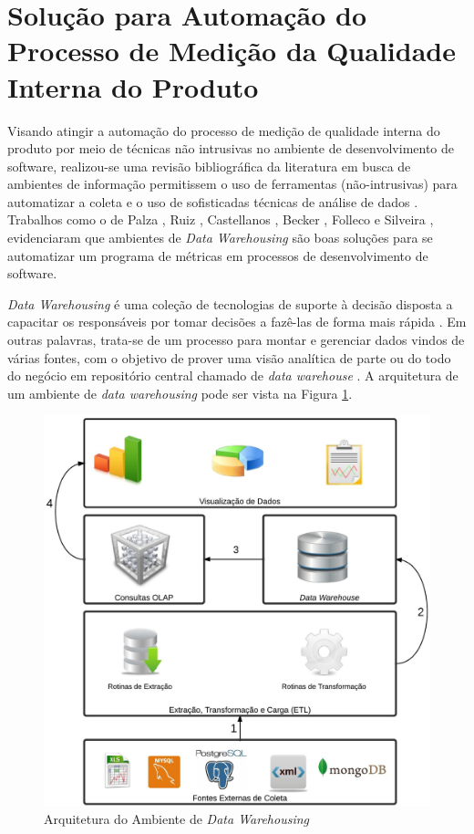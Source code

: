 \section{Solução para Automação do Processo de Medição da Qualidade Interna do Produto}
\label{sec:solucao}

Visando atingir a automação do processo de medição de qualidade interna do produto por meio de técnicas não intrusivas no ambiente de desenvolvimento de software, realizou-se uma revisão bibliográfica da literatura em busca de ambientes de informação permitissem o uso de ferramentas (não-intrusivas) para automatizar a coleta e o uso de sofisticadas técnicas de análise de dados \cite{Gopal2005} . Trabalhos como o de Palza \cite{Palza2003},  Ruiz \cite{Ruiz2005}, Castellanos \cite{Castellanos2005},  Becker \cite{Becker2006}, Folleco \cite{Folleco2007} e Silveira \cite{Silveira2010}, evidenciaram que ambientes de \textit{Data Warehousing} são boas soluções para se automatizar um programa de métricas em processos de desenvolvimento de software.

\textit{Data Warehousing} é uma coleção de tecnologias de suporte à decisão disposta a capacitar os responsáveis por tomar decisões a fazê-las de forma mais rápida \cite{chaudhuri1997} \cite{andre2000}. Em outras palavras, trata-se de um processo para montar e gerenciar dados vindos de várias fontes, com o objetivo de prover uma visão analítica de parte ou do todo do negócio em repositório central chamado de \textit{data warehouse} \cite{gardner1998} \cite{Kimball2002}. A arquitetura de um ambiente de \textit{data warehousing} pode ser vista na Figura \ref{arquitetura}. 

\begin{figure}[ht!]
\centering
\includegraphics[keepaspectratio=false,scale=0.14]{figuras/Dwing.eps}
\caption{Arquitetura do Ambiente de \textit{Data Warehousing}}
\label{arquitetura}
\end{figure}
\FloatBarrier



